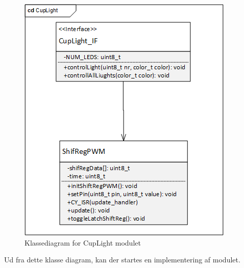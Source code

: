 \documentclass[Softwaredesign/Softwaredesign_main.tex]{subfiles}
\begin{document}
\begin{figure}[H]
    \centering
    \includegraphics[width=\textwidth]{Softwaredesign/CupLight_IF/graphics/CD_CupLight.png}
    \caption{Klassediagram for CupLight modulet}
    \label{fig:cd_cuplight}
\end{figure}
Ud fra dette klasse diagram, kan der startes en implementering af modulet.
\end{document}
